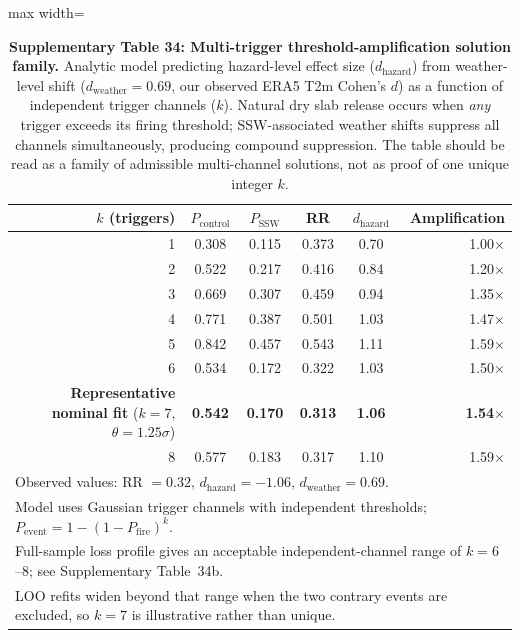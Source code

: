 \documentclass[11pt,letterpaper]{article}
\begin{document}
\begin{table}[h!]
\centering
\caption{\textbf{Supplementary Table 34: Multi-trigger threshold-amplification solution family.} Analytic model predicting hazard-level effect size ($d_{\mathrm{hazard}}$) from weather-level shift ($d_{\mathrm{weather}} = 0.69$, our observed ERA5 T2m Cohen's $d$) as a function of independent trigger channels ($k$). Natural dry slab release occurs when \emph{any} trigger exceeds its firing threshold; SSW-associated weather shifts suppress all channels simultaneously, producing compound suppression. The table should be read as a family of admissible multi-channel solutions, not as proof of one unique integer $k$.}
\label{tab:threshold_amp}
\begin{adjustbox}{max width=\textwidth}
\begin{tabular}{rccccr}
\toprule
$k$ (triggers) & $P_{\mathrm{control}}$ & $P_{\mathrm{SSW}}$ & RR & $d_{\mathrm{hazard}}$ & Amplification \\
\midrule
1 & 0.308 & 0.115 & 0.373 & 0.70 & 1.00$\times$ \\
2 & 0.522 & 0.217 & 0.416 & 0.84 & 1.20$\times$ \\
3 & 0.669 & 0.307 & 0.459 & 0.94 & 1.35$\times$ \\
4 & 0.771 & 0.387 & 0.501 & 1.03 & 1.47$\times$ \\
5 & 0.842 & 0.457 & 0.543 & 1.11 & 1.59$\times$ \\
6 & 0.534 & 0.172 & 0.322 & 1.03 & 1.50$\times$ \\
\midrule
\textbf{Representative nominal fit} ($k = 7$, $\theta = 1.25\sigma$) & \textbf{0.542} & \textbf{0.170} & \textbf{0.313} & \textbf{1.06} & \textbf{1.54$\times$} \\
8 & 0.577 & 0.183 & 0.317 & 1.10 & 1.59$\times$ \\
\bottomrule
\multicolumn{6}{l}{\footnotesize Observed values: RR $= 0.32$, $d_{\mathrm{hazard}} = -1.06$, $d_{\mathrm{weather}} = 0.69$.} \\
\multicolumn{6}{l}{\footnotesize Model uses Gaussian trigger channels with independent thresholds; $P_{\mathrm{event}} = 1 - (1 - P_{\mathrm{fire}})^k$.} \\
\multicolumn{6}{l}{\footnotesize Full-sample loss profile gives an acceptable independent-channel range of $k = 6$--$8$; see Supplementary Table~34b.} \\
\multicolumn{6}{l}{\footnotesize LOO refits widen beyond that range when the two contrary events are excluded, so $k = 7$ is illustrative rather than unique.} \\
\end{tabular}
\end{adjustbox}
\end{table}
\end{document}
